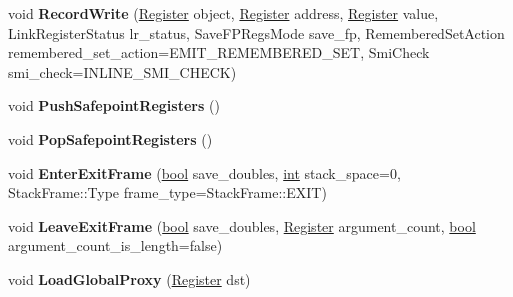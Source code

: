 \begin{DoxyCompactItemize}
\mbox{\label{classv8_1_1internal_1_1MacroAssembler_aafeb4e1da90d61d024029e1f75ca4490}} 
void {\bfseries Record\+Write} (\mbox{\hyperlink{classv8_1_1internal_1_1Register}{Register}} object, \mbox{\hyperlink{classv8_1_1internal_1_1Register}{Register}} address, \mbox{\hyperlink{classv8_1_1internal_1_1Register}{Register}} value, Link\+Register\+Status lr\+\_\+status, Save\+F\+P\+Regs\+Mode save\+\_\+fp, Remembered\+Set\+Action remembered\+\_\+set\+\_\+action=E\+M\+I\+T\+\_\+\+R\+E\+M\+E\+M\+B\+E\+R\+E\+D\+\_\+\+S\+ET, Smi\+Check smi\+\_\+check=I\+N\+L\+I\+N\+E\+\_\+\+S\+M\+I\+\_\+\+C\+H\+E\+CK)
\item 
\mbox{\label{classv8_1_1internal_1_1MacroAssembler_aca545d9193d7a468e285a5ba66fb6f19}} 
void {\bfseries Push\+Safepoint\+Registers} ()
\item 
\mbox{\label{classv8_1_1internal_1_1MacroAssembler_accf004371b050ef53eb57724f4d8d8b1}} 
void {\bfseries Pop\+Safepoint\+Registers} ()
\item 
\mbox{\label{classv8_1_1internal_1_1MacroAssembler_ab0efeeb5ce8ac90b32ce83e0c66b00d7}} 
void {\bfseries Enter\+Exit\+Frame} (\mbox{\hyperlink{classbool}{bool}} save\+\_\+doubles, \mbox{\hyperlink{classint}{int}} stack\+\_\+space=0, Stack\+Frame\+::\+Type frame\+\_\+type=Stack\+Frame\+::\+E\+X\+IT)
\item 
\mbox{\label{classv8_1_1internal_1_1MacroAssembler_aebb4e8ea72d795f41fc8abdfea974d2a}} 
void {\bfseries Leave\+Exit\+Frame} (\mbox{\hyperlink{classbool}{bool}} save\+\_\+doubles, \mbox{\hyperlink{classv8_1_1internal_1_1Register}{Register}} argument\+\_\+count, \mbox{\hyperlink{classbool}{bool}} argument\+\_\+count\+\_\+is\+\_\+length=false)
\item 
\mbox{\label{classv8_1_1internal_1_1MacroAssembler_a8139c3ce1dd60f65909755011ef7f9d1}} 
void {\bfseries Load\+Global\+Proxy} (\mbox{\hyperlink{classv8_1_1internal_1_1Register}{Register}} dst)
\item 
\mbox{\label{classv8_1_1internal_1_1MacroAssembler_abb9c73f938328171318c7cc010a7b53c}} 

\end{DoxyCompactItemize}

